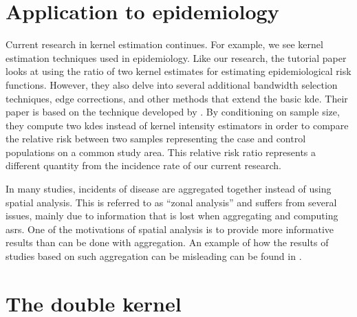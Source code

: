 
\section{Application to epidemiology}

Current research in kernel estimation continues.
For example, we see kernel estimation techniques used in epidemiology.
Like our research,
the tutorial paper \citet{davies2018tutorial} looks at using the ratio of two kernel estimates for estimating epidemiological risk functions.
However,
they also delve into several additional bandwidth selection techniques,
edge corrections,
and other methods that extend the basic \gls{kde}.
Their paper is based on the technique developed by \citet{bithell1990application,bithell1991estimation,kelsall1995kernel}.
By conditioning on sample size,
they compute two \glspl{kde} instead of \glspl{kernel intensity estimator} in order to compare the relative risk between two samples representing the case and control populations on a common study area.
This relative risk ratio represents a different quantity from the incidence rate of our current research.

In many studies,
incidents of disease are aggregated together instead of using spatial analysis.
This is referred to as ``zonal analysis'' and suffers from several issues,
mainly due to information that is lost when aggregating and computing \glspl{asr}.
One of the motivations of spatial analysis is to provide more informative results than can be done with aggregation.
An example of how the results of studies based on such aggregation can be misleading can be found in \citet{portnov2007ecological}.

\section{The double kernel}

